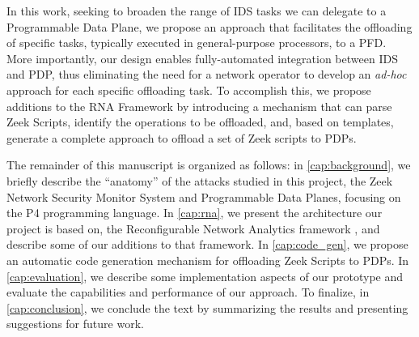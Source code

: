 
In this work, seeking to broaden the range of IDS tasks we can delegate to a Programmable Data Plane, we propose an approach that facilitates the offloading of specific tasks, typically executed in general-purpose processors, to a PFD. More importantly, our design enables fully-automated integration between IDS and PDP, thus eliminating the need for a network operator to develop an \textit{ad-hoc} approach for each specific offloading task. To accomplish this, we propose additions to the RNA Framework by introducing a mechanism that can parse Zeek Scripts, identify the operations to be offloaded, and, based on templates, generate a complete approach to offload a set of Zeek scripts to PDPs.

\newpage


The remainder of this manuscript is organized as follows: in \autoref{cap:background}, we briefly describe the ``anatomy'' of the attacks studied in this project, the Zeek Network Security Monitor System and Programmable Data Planes, focusing on the P4 programming language. In \autoref{cap:rna}, we present the architecture our project is based on, the Reconfigurable Network Analytics framework \cite{Ilha2022}, and describe some of our additions to that framework. In \autoref{cap:code_gen}, we propose an automatic code generation mechanism for offloading Zeek Scripts to PDPs. In \autoref{cap:evaluation}, we describe some implementation aspects of our prototype and evaluate the capabilities and performance of our approach. To finalize, in \autoref{cap:conclusion}, we conclude the text by summarizing the results and presenting suggestions for future work.